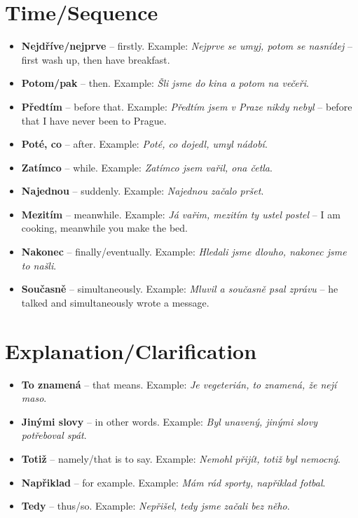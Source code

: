 \documentclass[12pt]{book}
\begin{document}
\section{Time/Sequence}
\begin{itemize}
    \item \textbf{Nejdříve/nejprve} -- firstly. Example: \emph{Nejprve se umyj, potom se nasnídej} -- 
        first wash up, then have breakfast.
    
    \item \textbf{Potom/pak} -- then. Example: \emph{Šli jsme do kina a potom na večeři}.
    \item \textbf{Předtím} -- before that. Example: \emph{Předtím jsem v Praze nikdy nebyl} -- 
        before that I have never been to Prague.
    
    \item \textbf{Poté, co} -- after. Example: \emph{Poté, co dojedl, umyl nádobí}.
    \item \textbf{Zatímco} -- while. Example: \emph{Zatímco jsem vařil, ona četla}.
    \item \textbf{Najednou} -- suddenly. Example: \emph{Najednou začalo pršet}.
    \item \textbf{Mezitím} -- meanwhile. Example: \emph{Já vařim, mezitím ty ustel postel} --
        I am cooking, meanwhile you make the bed.
    
    \item \textbf{Nakonec} -- finally/eventually. Example: \emph{Hledali jsme dlouho, nakonec jsme to našli}.
    \item \textbf{Současně} -- simultaneously. Example: \emph{Mluvil a současně psal zprávu} -- 
        he talked and simultaneously wrote a message.
\end{itemize}

\section{Explanation/Clarification}
\begin{itemize}
    \item \textbf{To znamená} -- that means. Example: \emph{Je vegeterián, to znamená, že nejí maso}.
    \item \textbf{Jinými slovy} -- in other words. Example: \emph{Byl unavený, jinými slovy potřeboval spát}.
    \item \textbf{Totiž} -- namely/that is to say. Example: \emph{Nemohl přijít, totiž byl nemocný}.
    \item \textbf{Napřiklad} -- for example. Example: \emph{Mám rád sporty, napřiklad fotbal}.
    \item \textbf{Tedy} -- thus/so. Example: \emph{Nepřišel, tedy jsme začali bez něho}.
\end{itemize}
\end{document}
